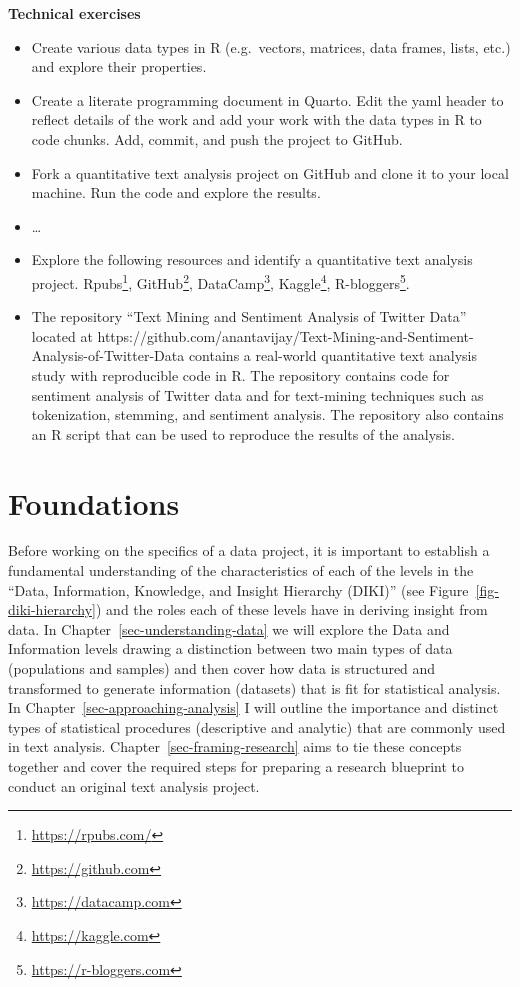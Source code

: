 \documentclass[
  letterpaper,
]{latex/krantz}
\providecommand{\tightlist}{%
  \setlength{\itemsep}{0pt}\setlength{\parskip}{0pt}}\usepackage{longtable,booktabs,array}
\DeclareRobustCommand{\href}[2]{#2\footnote{\url{#1}}}
\begin{document}
\begin{tcolorbox}[enhanced jigsaw, arc=.35mm, leftrule=.75mm, rightrule=.15mm, opacityback=0, colback=white, breakable, bottomrule=.15mm, left=2mm, toprule=.15mm]

\textbf{Technical exercises}

\begin{itemize}
\tightlist
\item
  Create various data types in R (e.g.~vectors, matrices, data frames,
  lists, etc.) and explore their properties.
\item
  Create a literate programming document in Quarto. Edit the yaml header
  to reflect details of the work and add your work with the data types
  in R to code chunks. Add, commit, and push the project to GitHub.
\item
  Fork a quantitative text analysis project on GitHub and clone it to
  your local machine. Run the code and explore the results.
\item
  \ldots{}
\item
  Explore the following resources and identify a quantitative text
  analysis project. \href{https://rpubs.com/}{Rpubs},
  \href{https://github.com}{GitHub},
  \href{https://datacamp.com}{DataCamp},
  \href{https://kaggle.com}{Kaggle},
  \href{https://r-bloggers.com}{R-bloggers}.
\item
  The repository ``Text Mining and Sentiment Analysis of Twitter Data''
  located at
  https://github.com/anantavijay/Text-Mining-and-Sentiment-Analysis-of-Twitter-Data
  contains a real-world quantitative text analysis study with
  reproducible code in R. The repository contains code for sentiment
  analysis of Twitter data and for text-mining techniques such as
  tokenization, stemming, and sentiment analysis. The repository also
  contains an R script that can be used to reproduce the results of the
  analysis.
\end{itemize}

\end{tcolorbox}

\part{Foundations}

Before working on the specifics of a data project, it is important to
establish a fundamental understanding of the characteristics of each of
the levels in the ``Data, Information, Knowledge, and Insight Hierarchy
(DIKI)'' (see Figure~\ref{fig-diki-hierarchy}) and the roles each of
these levels have in deriving insight from data. In
Chapter~\ref{sec-understanding-data} we will explore the Data and
Information levels drawing a distinction between two main types of data
(populations and samples) and then cover how data is structured and
transformed to generate information (datasets) that is fit for
statistical analysis. In Chapter~\ref{sec-approaching-analysis} I will
outline the importance and distinct types of statistical procedures
(descriptive and analytic) that are commonly used in text analysis.
Chapter~\ref{sec-framing-research} aims to tie these concepts together
and cover the required steps for preparing a research blueprint to
conduct an original text analysis project.
\end{document}
